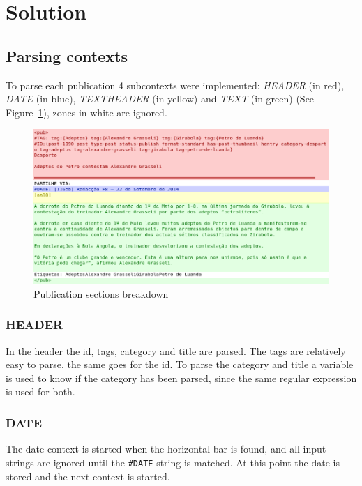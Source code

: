 \documentclass[a4paper]{article}
\begin{document}
\section{Solution}

\subsection{Parsing contexts}

To parse each publication 4 subcontexts were implemented: \textit{HEADER} (in
red), \textit{DATE} (in blue), \textit{TEXTHEADER} (in yellow) and
\textit{TEXT} (in green) (See Figure~\ref{fig:example_pub_colored}), zones in
white are ignored.

\begin{figure}[H]
    \includegraphics[width=\textwidth]{./example_pub_colored.png}
    \caption{Publication sections breakdown}\label{fig:example_pub_colored}
\end{figure}

\subsubsection{HEADER}

In the header the id, tags, category and title are parsed. The tags are
relatively easy to parse, the same goes for the id. To parse the category and
title a variable is used to know if the category has been parsed, since the
same regular expression is used for both.

\subsubsection{DATE}

The date context is started when the horizontal bar is found, and all input
strings are ignored until the \texttt{\#DATE} string is matched. At this point
the date is stored and the next context is started.
\end{document}
